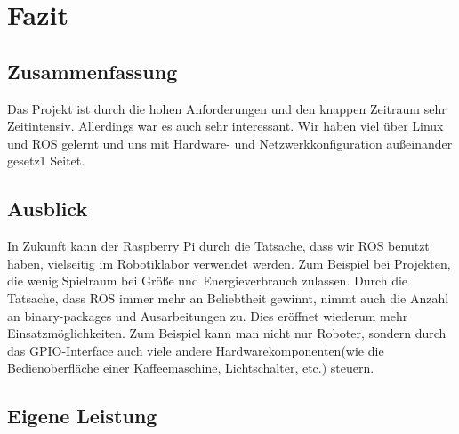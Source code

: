 \documentclass[12pt]{article}
\begin{document}








\section{Fazit}
\subsection{Zusammenfassung}

Das Projekt ist durch die hohen Anforderungen und den knappen Zeitraum sehr Zeitintensiv. Allerdings war es auch sehr interessant. Wir haben viel über Linux und ROS gelernt und uns mit Hardware- und Netzwerkkonfiguration außeinander gesetz1 Seitet.


\subsection{Ausblick}

In Zukunft kann der Raspberry Pi durch die Tatsache, dass wir ROS benutzt haben, vielseitig im Robotiklabor verwendet werden. Zum Beispiel bei Projekten, die wenig Spielraum bei Größe und Energieverbrauch zulassen.
Durch die Tatsache, dass ROS immer mehr an Beliebtheit gewinnt, nimmt auch die Anzahl an binary-packages und Ausarbeitungen zu. Dies eröffnet wiederum mehr Einsatzmöglichkeiten.
Zum Beispiel kann man nicht nur Roboter, sondern durch das GPIO-Interface auch viele andere Hardwarekomponenten(wie die Bedienoberfläche einer Kaffeemaschine, Lichtschalter, etc.) steuern.  


\subsection{Eigene Leistung}
\end{document}
